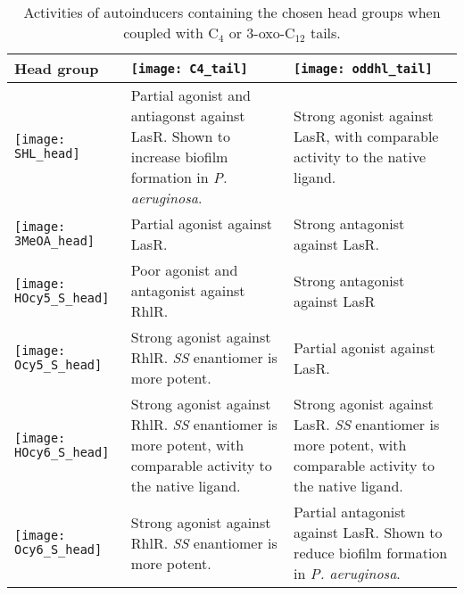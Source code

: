\begin{table}[H]
  \centering
\begin{tabular}{|M{0.20\textwidth}|m{0.30\textwidth}|m{0.30\textwidth}|}
\hline 
 \textbf{Head group} & \vspace{5px}\centering\texttt{[image: C4\_tail]} & \centering\arraybackslash\vspace{5px}\texttt{[image: oddhl\_tail]} \\ 
\hline 
 \vspace{5px}\texttt{[image: SHL\_head]} 
 & Partial agonist and antiagonst against LasR\cite{McInnis2011}. Shown to increase biofilm formation in \textit{P. aeruginosa}\cite{Ganguly2011}.
 & Strong agonist against LasR, with comparable activity to the native ligand\cite{Smith2003,Boursier2018,Passador1996,McInnis2011}. \\ 
\hline 
 \vspace{5px}\texttt{[image: 3MeOA\_head]} 
 & Partial agonist against LasR\cite{Hodgkinson2012a}. 
 & Strong antagonist against LasR\cite{Hodgkinson2012a}. \\ 
\hline 
 \vspace{5px}\texttt{[image: HOcy5\_S\_head]} 
 & Poor agonist and antagonist against RhlR\cite{Smith2003a,Jog2006}.
 & Strong antagonist against LasR\cite{Smith2003a}\\ 
\hline 
 \vspace{5px}\texttt{[image: Ocy5\_S\_head]} 
 & Strong agonist against RhlR\cite{Smith2003a}. \textit{SS} enantiomer is more potent\cite{Jog2006}.
 & Partial agonist against LasR\cite{Smith2003a}. \\ 
\hline 
 \vspace{5px}\texttt{[image: HOcy6\_S\_head]} 
 & Strong agonist against RhlR\cite{Smith2003a}. \textit{SS} enantiomer is more potent, with comparable activity to the native ligand\cite{Jog2006}.
 & Strong agonist against LasR\cite{Smith2003,Smith2003a}. \textit{SS} enantiomer is more potent, with comparable activity to the native ligand\cite{Jog2006}.\\ 
\hline 
 \vspace{5px}\texttt{[image: Ocy6\_S\_head]} 
 & Strong agonist against RhlR\cite{Smith2003a}. \textit{SS} enantiomer is more potent\cite{Jog2006}.
 & Partial antagonist against LasR\cite{Smith2003a}. Shown to reduce biofilm formation in \textit{P. aeruginosa}\cite{Smith2003a}.\\ 
\hline 
\end{tabular}
\caption{Activities of autoinducers containing the chosen head groups when coupled with C$_4$ or 3-oxo-C$_12$ tails.\label{tbl:head_groups}} 
\end{table}

